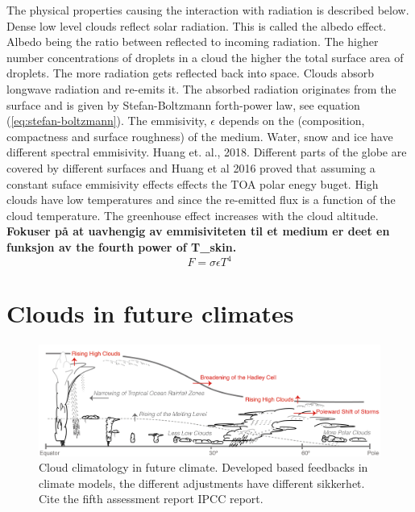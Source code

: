 The physical properties causing the interaction with radiation is described below. Dense low level clouds reflect solar radiation. This is called the albedo effect. Albedo being the ratio between reflected to incoming radiation. The higher number concentrations of droplets in a cloud the higher the total surface area of droplets. The more radiation gets reflected back into space. Clouds absorb longwave radiation and re-emits it. The absorbed radiation originates from the surface and is given by Stefan-Boltzmann forth-power law, see equation (\ref{eq:stefan-boltzmann}). The emmisivity, $\epsilon$ depends on the (composition, compactness and surface roughness) of the medium. Water, snow and ice have different spectral emmisivity. Huang et. al., 2018. Different parts of the globe are covered by different surfaces and Huang et al 2016 proved that assuming a constant suface emmisivity effects effects the TOA polar enegy buget. High clouds have low temperatures and since the re-emitted flux is a function of the cloud temperature. The greenhouse effect increases with the cloud altitude.
\textbf{Fokuser på at uavhengig av emmisiviteten til et medium er deet en funksjon av the fourth power of T_{skin}.}
\begin{equation} \label{eq:stefan-boltzmann}
    F = \sigma \epsilon T ^4
\end{equation}

\section{Clouds in future climates} \label{sec:intro_cloud_future_climates}
\begin{figure}[h]
    \centering
    \includegraphics[scale = 0.8]{Chapter1_Intro/images/Fig7-11_ipcc.jpg}
    \caption{Cloud climatology in future climate. Developed based feedbacks in climate models, the different adjustments have different sikkerhet. Cite the fifth assessment report IPCC report.}
    \label{fig:cloud_scheme}
\end{figure}

